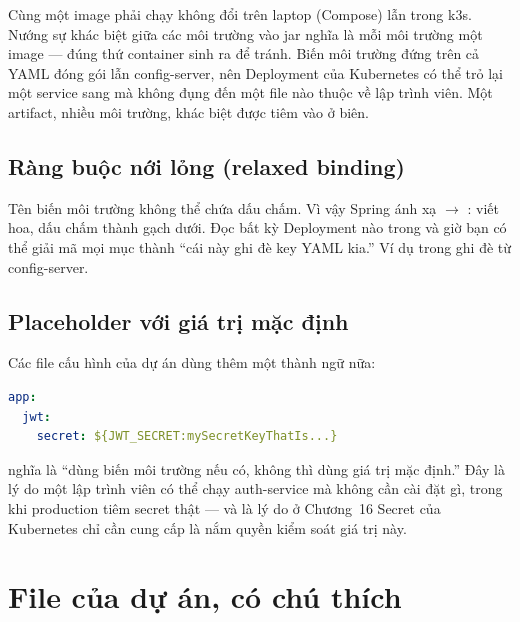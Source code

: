 \begin{decision}
Cùng một image phải chạy không đổi trên laptop (Compose) lẫn trong k3s.
Nướng sự khác biệt giữa các môi trường vào jar nghĩa là mỗi môi trường
một image --- đúng thứ container sinh ra để tránh. Biến môi trường đứng
trên cả YAML đóng gói lẫn config-server, nên Deployment của Kubernetes có
thể trỏ lại một service sang  mà không đụng
đến một file nào thuộc về lập trình viên. Một artifact, nhiều môi trường,
khác biệt được tiêm vào ở biên.
\end{decision}

\subsection{Ràng buộc nới lỏng (relaxed binding)}

Tên biến môi trường không thể chứa dấu chấm. Vì vậy Spring ánh xạ
 $\rightarrow$ :
viết hoa, dấu chấm thành gạch dưới. Đọc bất kỳ Deployment nào trong
 và giờ bạn có thể giải mã mọi mục 
thành ``cái này ghi đè key YAML kia.'' Ví dụ
 trong 
ghi đè  từ config-server.

\subsection{Placeholder với giá trị mặc định}

Các file cấu hình của dự án dùng thêm một thành ngữ nữa:

\begin{lstlisting}[language=yaml]
app:
  jwt:
    secret: ${JWT_SECRET:mySecretKeyThatIs...}
\end{lstlisting}

 nghĩa là ``dùng biến môi trường nếu có, không
thì dùng giá trị mặc định.'' Đây là lý do một lập trình viên có thể chạy
auth-service mà không cần cài đặt gì, trong khi production tiêm secret
thật --- và là lý do ở Chương~16 Secret của Kubernetes chỉ cần cung cấp
 là nắm quyền kiểm soát giá trị này.

\section{File của dự án, có chú thích}


